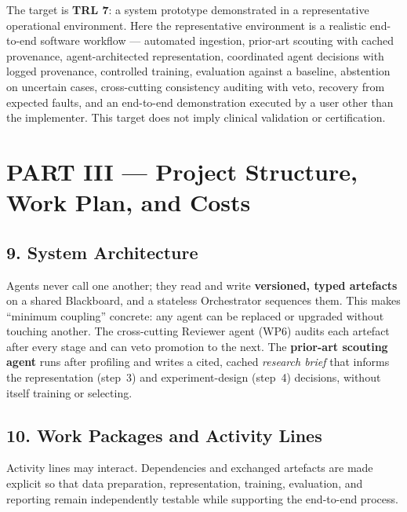 \documentclass[11pt,a4paper]{article}
\begin{document}
The target is \textbf{TRL 7}: a system prototype demonstrated in a representative operational environment. Here the representative environment is a realistic end-to-end software workflow --- automated ingestion, prior-art scouting with cached provenance, agent-architected representation, coordinated agent decisions with logged provenance, controlled training, evaluation against a baseline, abstention on uncertain cases, cross-cutting consistency auditing with veto, recovery from expected faults, and an end-to-end demonstration executed by a user other than the implementer. This target does not imply clinical validation or certification.

\section*{PART III --- Project Structure, Work Plan, and Costs}

\subsection*{9. System Architecture}
Agents never call one another; they read and write \textbf{versioned, typed artefacts} on a shared Blackboard, and a stateless Orchestrator sequences them. This makes ``minimum coupling'' concrete: any agent can be replaced or upgraded without touching another. The cross-cutting Reviewer agent (WP6) audits each artefact after every stage and can veto promotion to the next. The \textbf{prior-art scouting agent} runs after profiling and writes a cited, cached \emph{research brief} that informs the representation (step~3) and experiment-design (step~4) decisions, without itself training or selecting.

\begin{center}
\resizebox{0.98\textwidth}{!}{}
\end{center}

\subsection*{10. Work Packages and Activity Lines}
Activity lines may interact. Dependencies and exchanged artefacts are made explicit so that data preparation, representation, training, evaluation, and reporting remain independently testable while supporting the end-to-end process.
\end{document}
